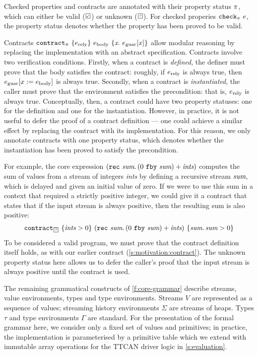 \documentclass[a4paper,UKenglish,cleveref, autoref, thm-restate,anonymous]{lipics-v2021}
\begin{document}
Checked properties and contracts are annotated with their property status $\pi$, which can either be valid ($\PSValid$) or unknown ($\PSUnknown$).
For checked properies $\texttt{check}_{\pi}~e$, the property status denotes whether the property has been proved to be valid.

Contracts $\texttt{contract}_{\pi}~\{e_{\text{rely}}\}~e_{\text{body}}~\{x\hspace{-0.1em}.~e_{\text{guar}}[x]\}$ allow modular reasoning by replacing the implementation with an abstract specification.
Contracts involve two verification conditions.
Firstly, when a contract is \emph{defined}, the definer must prove that the body satisfies the contract: roughly, if $e_{\text{rely}}$ is always true, then $e_{\text{guar}}[x := e_{\text{body}}]$ is always true.
Secondly, when a contract is \emph{instantiated}, the caller must prove that the environment satisfies the precondition: that is, $e_{\text{rely}}$ is always true.
Conceptually, then, a contract could have two property statuses: one for the definition and one for the instantiation.
However, in practice, it is not useful to defer the proof of a contract definition --- one could achieve a similar effect by replacing the contract with its implementation.
For this reason, we only annotate contracts with one property status, which denotes whether the instantiation has been proved to satisfy the precondition.

For example, the core expression $(\texttt{rec}~\textit{sum}.\, (0~\texttt{fby}~\textit{sum}) + \textit{ints})$ computes the sum of values from a stream of integers \emph{ints} by defining a recursive stream $\textit{sum}$, which is delayed and given an initial value of zero.
If we were to use this sum in a context that required a strictly positive integer, we could give it a contract that states that if the input stream is always positive, then the resulting sum is also positive:
$$
\sumcontract
$$
To be considered a valid program, we must prove that the contract definition itself holds, as with our earlier contract (\autoref{s:motivation:contract}).
The unknown property status here allows us to defer the caller's proof that the input stream is always positive until the contract is used.



The remaining grammatical constructs of \autoref{f:core-grammar} describe streams, value environments, types and type environments.
Streams $V$ are represented as a sequence of values; streaming history environments $\Sigma$ are streams of heaps.
Types $\tau$ and type environments $\Gamma$ are standard.
For the presentation of the formal grammar here, we consider only a fixed set of values and primitives; in practice, the implementation is parameterised by a primitive table which we extend with immutable array operations for the TTCAN driver logic in \autoref{s:evaluation}.
\end{document}
